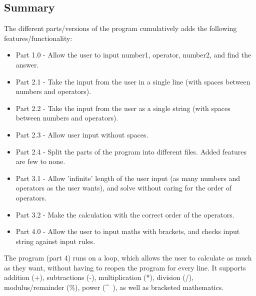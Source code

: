 \documentclass{article}
\begin{document}
		
		\subsection{Summary}
			The different parts/versions of the program cumulatively adds the following features/functionality:
			\begin{itemize}
				\item Part 1.0	- Allow the user to input number1, operator, number2, and find the answer.
				\item Part 2.1	- Take the input from the user in a single line (with spaces between numbers and operators).
				\item Part 2.2	- Take the input from the user as a single string (with spaces between numbers and operators).
				\item Part 2.3	- Allow user input without spaces.
				\item Part 2.4	- Split the parts of the program into different files. Added features are few to none.
				\item Part 3.1	- Allow 'infinite' length of the user input (as many numbers and operators as the user wants), and solve without caring for the order of operators.
				\item Part 3.2	- Make the calculation with the correct order of the operators.
				\item Part 4.0	- Allow the user to input maths with brackets, and checks input string against input rules.
			\end{itemize}
	
			The program (part 4) runs on a loop, which allows the user to calculate as much as they want, without having to reopen the program for every line.
			It supports addition (+), subtractions (-), multiplication (*), division (/), modulus/remainder (\%), power (\^~), as well as bracketed mathematics. \\
	
\end{document}
